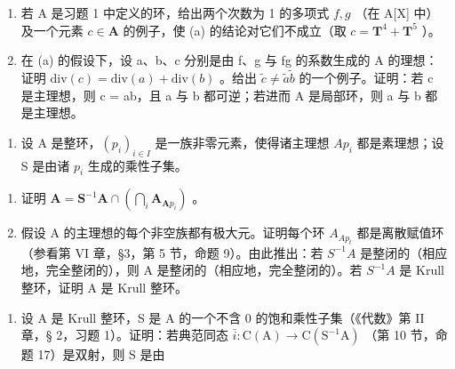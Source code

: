 \begin{enumerate}
\def\labelenumi{(\alph{enumi})}
\setcounter{enumi}{1}
\item
  若 A 是习题 1 中定义的环，给出两个次数为 1 的多项式 \(f, g\) （在 A{[}X{]} 中）及一个元素 \(c \in \mathbf{A}\) 的例子，使 (a) 的结论对它们不成立（取 \(c = \mathbf{T}^4 + \mathbf{T}^5\) ）。
\item
  在 (a) 的假设下，设 a、b、c 分别是由 f、g 与 fg 的系数生成的 A 的理想：证明 \(\text{div}(c) = \text{div}(a) + \text{div}(b)\) 。给出 \(\tilde{c} \neq \tilde{a}\tilde{b}\) 的一个例子。证明：若 c 是主理想，则 c = ab，且 a 与 b 都可逆；若进而 A 是局部环，则 a 与 b 都是主理想。
\end{enumerate}

\begin{enumerate}
\def\labelenumi{\arabic{enumi}.}
\setcounter{enumi}{12}
\tightlist
\item
  设 A 是整环，\((p_{i})_{i\in I}\) 是一族非零元素，使得诸主理想 \(Ap_{i}\) 都是素理想；设 S 是由诸 \(p_{i}\) 生成的乘性子集。
\end{enumerate}

\begin{enumerate}
\def\labelenumi{(\alph{enumi})}
\item
  证明 \(\mathbf{A} = \mathbf{S}^{-1}\mathbf{A}\cap \left(\bigcap_{i}\mathbf{A}_{\mathbf{A}p_i}\right)\) 。
\item
  假设 A 的主理想的每个非空族都有极大元。证明每个环 \(A_{Ap_{t}}\) 都是离散赋值环（参看第 VI 章，§3，第 5 节，命题 9）。由此推出：若 \(S^{-1}A\) 是整闭的（相应地，完全整闭的），则 A 是整闭的（相应地，完全整闭的）。若 \(S^{-1}A\) 是 Krull 整环，证明 A 是 Krull 整环。
\end{enumerate}

\begin{enumerate}
\def\labelenumi{\arabic{enumi}.}
\setcounter{enumi}{13}
\tightlist
\item
  设 A 是 Krull 整环，S 是 A 的一个不含 0 的饱和乘性子集（《代数》第 II 章，§ 2，习题 1）。证明：若典范同态 \(\bar{i}\colon\mathrm{C}(\mathrm{A})\to\mathrm{C}(\mathrm{S}^{-1}\mathrm{A})\) （第 10 节，命题 17）是双射，则 S 是由
\end{enumerate}
